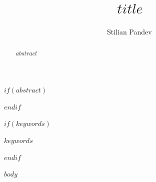 \documentclass[preprint,12pt]{elsarticle}
\begin{document}
\begin{frontmatter}

\title{$title$}

\author[ind]{Stilian Pandev\,}
\address[ind]{Independent researcher}

$if(abstract)$
\begin{abstract}
$abstract$
\end{abstract}
$endif$

$if(keywords)$
\begin{keyword}
$keywords$
\end{keyword}
$endif$

\end{frontmatter}

$body$



\end{document}
